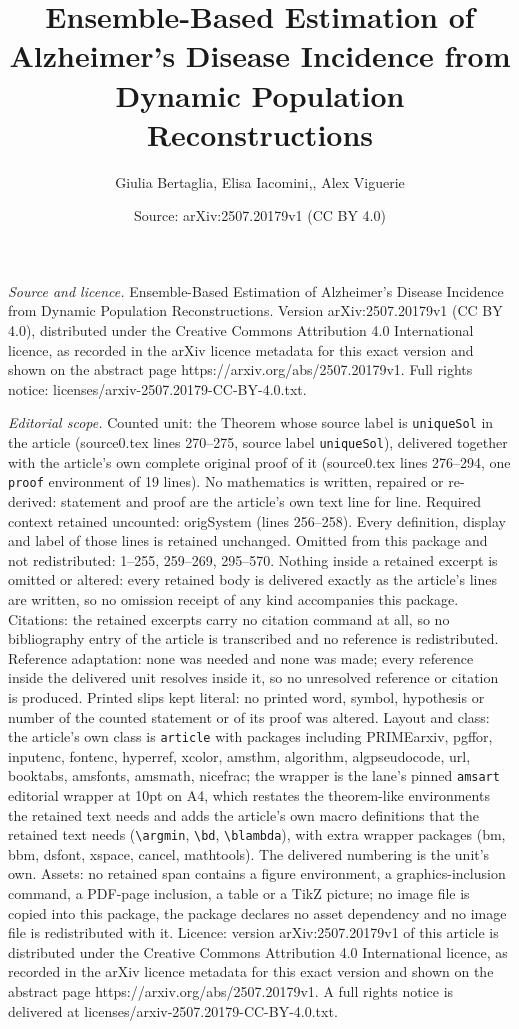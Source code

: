 \documentclass[10pt,a4paper]{amsart}
\title[Ensemble-Based Estimation of Alzheimer's Disease Incidence f]{Ensemble-Based Estimation of Alzheimer's Disease Incidence from Dynamic Population Reconstructions}
\author{Giulia Bertaglia, Elisa Iacomini,, Alex Viguerie}
\date{Source: arXiv:2507.20179v1 (CC BY 4.0)}
\begin{document}
\maketitle

\noindent\emph{Source and licence.} Ensemble-Based Estimation of Alzheimer's Disease Incidence from Dynamic Population Reconstructions. Version arXiv:2507.20179v1 (CC BY 4.0), distributed under the Creative Commons Attribution 4.0 International licence, as recorded in the arXiv licence metadata for this exact version and shown on the abstract page https://arxiv.org/abs/2507.20179v1. Full rights notice: licenses/arxiv-2507.20179-CC-BY-4.0.txt.\par\smallskip

\noindent\textit{Editorial scope.} Counted unit: the Theorem whose source label is \texttt{uniqueSol} in the article (source0.tex lines 270--275, source label \texttt{uniqueSol}), delivered together with the article's own complete original proof of it (source0.tex lines 276--294, one \texttt{proof} environment of 19 lines). No mathematics is written, repaired or re-derived: statement and proof are the article's own text line for line. Required context retained uncounted: origSystem (lines 256--258). Every definition, display and label of those lines is retained unchanged. Omitted from this package and not redistributed: 1--255, 259--269, 295--570. Nothing inside a retained excerpt is omitted or altered: every retained body is delivered exactly as the article's lines are written, so no omission receipt of any kind accompanies this package. Citations: the retained excerpts carry no citation command at all, so no bibliography entry of the article is transcribed and no reference is redistributed. Reference adaptation: none was needed and none was made; every reference inside the delivered unit resolves inside it, so no unresolved reference or citation is produced. Printed slips kept literal: no printed word, symbol, hypothesis or number of the counted statement or of its proof was altered. Layout and class: the article's own class is \texttt{article} with packages including PRIMEarxiv, pgffor, inputenc, fontenc, hyperref, xcolor, amsthm, algorithm, algpseudocode, url, booktabs, amsfonts, amsmath, nicefrac; the wrapper is the lane's pinned \texttt{amsart} editorial wrapper at 10pt on A4, which restates the theorem-like environments the retained text needs and adds the article's own macro definitions that the retained text needs (\texttt{\textbackslash argmin}, \texttt{\textbackslash bd}, \texttt{\textbackslash blambda}), with extra wrapper packages (bm, bbm, dsfont, xspace, cancel, mathtools). The delivered numbering is the unit's own. Assets: no retained span contains a figure environment, a graphics-inclusion command, a PDF-page inclusion, a table or a TikZ picture; no image file is copied into this package, the package declares no asset dependency and no image file is redistributed with it. Licence: version arXiv:2507.20179v1 of this article is distributed under the Creative Commons Attribution 4.0 International licence, as recorded in the arXiv licence metadata for this exact version and shown on the abstract page https://arxiv.org/abs/2507.20179v1. A full rights notice is delivered at licenses/arxiv-2507.20179-CC-BY-4.0.txt. 
\end{document}
